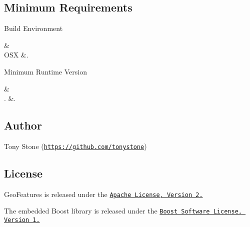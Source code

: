 \subsection*{Minimum Requirements}

Build Environment

\begin{TabularC}{2}
\hline
{}\PBS{}&\PBS{}\\
\PBS\centering O\+S\+X &\PBS{}. \\
\end{TabularC}
Minimum Runtime Version

\begin{TabularC}{2}
\hline
{}\PBS{}&\PBS{}\\
\PBS{}. &\PBS{}. \\
\end{TabularC}
\subsection*{Author}

Tony Stone (\href{https://github.com/tonystone}{\tt https\+://github.\+com/tonystone})

\subsection*{License}

Geo\+Features is released under the \href{http://www.apache.org/licenses/LICENSE-2.0.html}{\tt Apache License, Version 2.}

The embedded Boost library is released under the \href{http://www.boost.org/users/license.html}{\tt Boost Software License, Version 1.} 